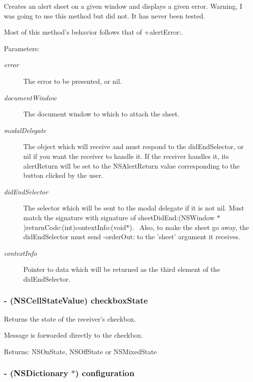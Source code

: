 Creates an alert sheet on a given window and displays a given error. Warning, I was going to use this method but did not. It has never been tested. 

Most of this method's behavior follows that of +alertError:. \begin{Desc}
\item[Parameters:]
\begin{description}
\item[{\em error}]The error to be presented, or nil. \item[{\em documentWindow}]The document window to which to attach the sheet. \item[{\em modalDelegate}]The object which will receive and must respond to the didEndSelector, or nil if you want the receiver to handle it. If the receiver handles it, its alertReturn will be set to the NSAlertReturn value corresponding to the button clicked by the user. \item[{\em didEndSelector}]The selector which will be sent to the modal delegate if it is not nil. Must match the signature with signature of sheetDidEnd:(NSWindow $\ast$)returnCode:(int)contextInfo:(void$\ast$).~ Also, to make the sheet go away, the didEndSelector must send -orderOut: to the 'sheet' argument it receives. \item[{\em contextInfo}]Pointer to data which will be returned as the third element of the didEndSelector. \end{description}
\end{Desc}
\hypertarget{interface_s_s_y_alert_b4d269b968b12c002a174839a8e319ad}{
\subsubsection[{checkboxState}]{\setlength{\rightskip}{0pt plus 5cm}- (NSCellStateValue) checkboxState }}
\label{interface_s_s_y_alert_b4d269b968b12c002a174839a8e319ad}


Returns the state of the receiver's checkbox. 

Message is forwarded directly to the checkbox. \begin{Desc}
\item[Returns:]NSOnState, NSOffState or NSMixedState \end{Desc}
\hypertarget{interface_s_s_y_alert_0be2eb58a0463feca0bf58361ffd3a13}{
\subsubsection[{configuration}]{\setlength{\rightskip}{0pt plus 5cm}- (NSDictionary $\ast$) configuration }}
\label{interface_s_s_y_alert_0be2eb58a0463feca0bf58361ffd3a13}


